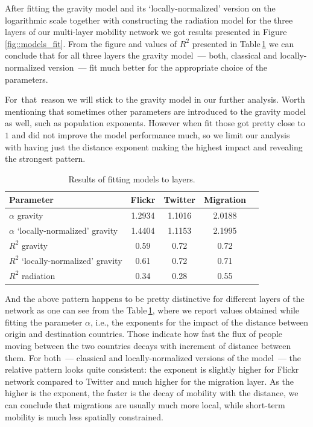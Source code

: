 \documentclass[aps,superscriptaddress,showkeys,nofootinbib]{revtex4-1}
\begin{document}
After fitting the gravity model and its `locally-normalized' version on the logarithmic scale together with constructing the radiation model for the three layers of our multi-layer mobility network we got results presented in Figure\,\ref{fig::models_fit}. From the figure and values of $R^2$ presented in Table\,\ref{tab::fit_results} we can conclude that for all three layers the gravity model~--- both, classical and locally-normalized version~--- fit much better for the appropriate choice of the parameters.

For~that~reason we will stick to the gravity model in our further analysis.
Worth mentioning that sometimes other parameters are introduced to the gravity model as well, such as population exponents. However when fit those got pretty close to $1$ and did not improve the model performance much, so we limit our analysis with having just the distance exponent making the highest impact and revealing the strongest pattern.

\begin{table}[t]
\caption{\label{tab::fit_results}Results of fitting models to layers.}
\centering
{
\begin{tabular}{|l|c|c|c|c|}
\hline
Parameter                                & Flickr  & Twitter & Migration  \\ \hline
$\alpha$ gravity                         & 1.2934  & 1.1016  & 2.0188     \\ \hline
$\alpha$ `locally-normalized' gravity    & 1.4404  & 1.1153  & 2.1995     \\ \hline
$R^2$ gravity                            & 0.59    & 0.72    & 0.72       \\ \hline
$R^2$ `locally-normalized' gravity       & 0.61    & 0.72    & 0.71       \\ \hline
$R^2$ radiation                          & 0.34    & 0.28    & 0.55       \\ \hline
\end{tabular}
}
\end{table}

And the above pattern happens to be pretty distinctive for different layers of the network as one can see from the Table\,\ref{tab::fit_results}, where we report values obtained while fitting the parameter $\alpha$, i.e., the exponents for the impact of the distance between origin and destination countries. Those indicate how fast the flux of people moving between the two countries decays with increment of distance between them. For both~--- classical and locally-normalized versions of the model~--- the relative pattern looks quite consistent: the exponent is slightly higher for Flickr network compared to Twitter and much higher for the migration layer. As the higher is the exponent, the faster is the decay of mobility with the distance, we can conclude that migrations are usually much more local, while short-term mobility is much less spatially constrained.
\end{document}
